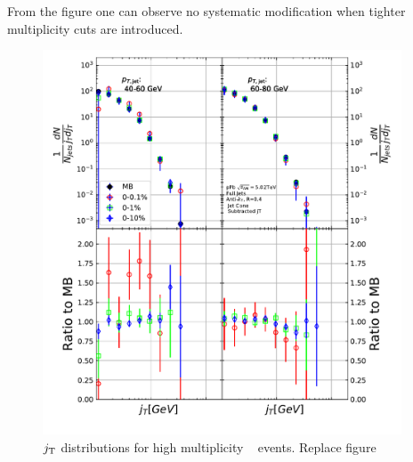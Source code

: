 From the figure one can observe no systematic modification when tighter multiplicity cuts are introduced. 

\begin{figure}[htb]
\includegraphics[width=0.95\textwidth]{results/HighMJetConeJtSignalPtFrom3To8.pdf}
\caption{$j_{\rm T}$ distributions for high multiplicity \pPb~ events. {\color{red} Replace figure}}
\label{fig:highm}
\end{figure}



